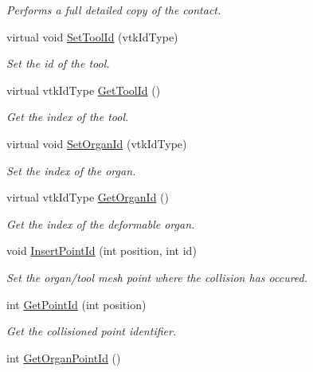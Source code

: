 \begin{DoxyCompactItemize}
\begin{DoxyCompactList}\small\item\em Performs a full detailed copy of the contact. \item\end{DoxyCompactList}\item 
virtual void \hyperlink{classvtkContact_aaa007969b63fb9627a8d07a0c5af5f44}{SetToolId} (vtkIdType)
\begin{DoxyCompactList}\small\item\em Set the id of the tool. \item\end{DoxyCompactList}\item 
virtual vtkIdType \hyperlink{classvtkContact_a6da6c11b7dde677ffe8305216d07b397}{GetToolId} ()
\begin{DoxyCompactList}\small\item\em Get the index of the tool. \item\end{DoxyCompactList}\item 
virtual void \hyperlink{classvtkContact_afae2207fe8a86b5d8855042f1dbd345c}{SetOrganId} (vtkIdType)
\begin{DoxyCompactList}\small\item\em Set the index of the organ. \item\end{DoxyCompactList}\item 
virtual vtkIdType \hyperlink{classvtkContact_a28dba7ad9b5ffb3bbefc4ec035ed738c}{GetOrganId} ()
\begin{DoxyCompactList}\small\item\em Get the index of the deformable organ. \item\end{DoxyCompactList}\item 
void \hyperlink{classvtkContact_adf2fd8546c9ca9f06e25f319bb6f82ac}{InsertPointId} (int position, int id)
\begin{DoxyCompactList}\small\item\em Set the organ/tool mesh point where the collision has occured. \item\end{DoxyCompactList}\item 
int \hyperlink{classvtkContact_a4b404cb999cbe287f2ea6c386e34d0fd}{GetPointId} (int position)
\begin{DoxyCompactList}\small\item\em Get the collisioned point identifier. \item\end{DoxyCompactList}\item 
\hypertarget{classvtkContact_ad823bd93ea5b6dfaa3490523710f8e98}{
int \hyperlink{classvtkContact_ad823bd93ea5b6dfaa3490523710f8e98}{GetOrganPointId} ()}
\label{classvtkContact_ad823bd93ea5b6dfaa3490523710f8e98}


\end{DoxyCompactItemize}
